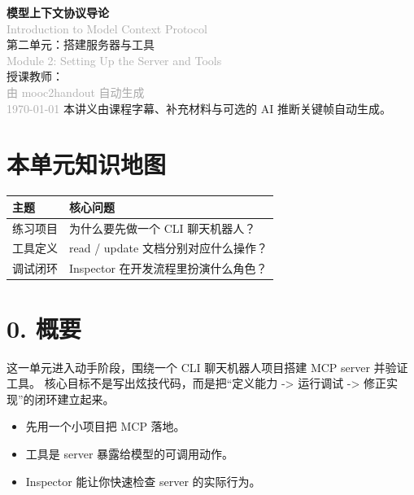 \documentclass[UTF8,a4paper,11pt]{ctexart}
\begin{document}
\begin{center}
  \vspace*{2cm}
  {\Huge\bfseries\color{accent} 模型上下文协议导论}\\[0.3cm]
  {\small\textcolor{darkgray}{Introduction to Model Context Protocol}}\\[0.8cm]
  {\LARGE 第二单元：搭建服务器与工具}\\[0.3cm]
  {\small\textcolor{darkgray}{Module 2: Setting Up the Server and Tools}}\\[1.2cm]
  {\large 授课教师： }\\[0.5cm]
  {\large\textcolor{darkgray}{由 mooc2handout 自动生成}}\\[0.3cm]
  {\small\textcolor{darkgray}{\today}}
  \vfill
  {\small 本讲义由课程字幕、补充材料与可选的 AI 推断关键帧自动生成。}
\end{center}
\newpage

\tableofcontents
\newpage

\section*{本单元知识地图}
\begin{longtable}{p{3.1cm}p{10.2cm}}
\toprule
主题 & 核心问题 \\
\midrule
练习项目 & 为什么要先做一个 CLI 聊天机器人？ \\
工具定义 & read / update 文档分别对应什么操作？ \\
调试闭环 & Inspector 在开发流程里扮演什么角色？ \\
\bottomrule
\end{longtable}

\section*{0. 概要}
这一单元进入动手阶段，围绕一个 CLI 聊天机器人项目搭建 MCP server 并验证工具。
核心目标不是写出炫技代码，而是把“定义能力 -> 运行调试 -> 修正实现”的闭环建立起来。

\begin{itemize}
  \item 先用一个小项目把 MCP 落地。
  \item 工具是 server 暴露给模型的可调用动作。
  \item Inspector 能让你快速检查 server 的实际行为。
\end{itemize}
\end{document}
